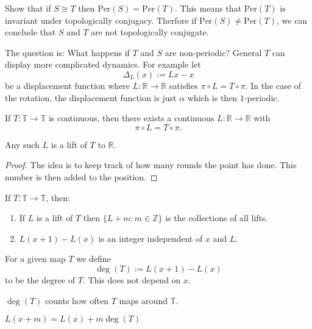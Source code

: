 \documentclass{article}
\newcommand*{\Z}{\mathbb{Z}}
\newcommand*{\R}{\mathbb{R}}
\newcommand*{\T}{\mathbb{T}}
\newcommand*{\Per}{\text{Per}}
\begin{document}
\begin{hw}
    Show that if $S\cong T$ then $\Per(S)=\Per(T)$. This means that $\Per(T)$ is invariant under topologically conjugacy. Therfore if $\Per(S) \neq \Per(T)$, we can conclude that $S$ and $T$ are not topologically conjugate.
\end{hw}

The question is: What happens if $T$ and $S$ are non-periodic?
\newline
\newline
General $T$ can display more complicated dynamics. For example let
$$\Delta_L(x):= Lx-x$$
be a displacement function where $L:\R\to\R$ satisfies $\pi\circ L = T \circ \pi$. In the case of the rotation, the displacement function is just $\alpha$ which is then $1$-periodic.

\begin{prop}
    If $T:\T\to\T$ is continuous, then there exists a continuous $L:\R\to\R$ with
    $$\pi\circ L=T\circ \pi.$$
\end{prop}

\begin{defin}
    Any such $L$ is a lift of $T$ to $\R$.
\end{defin}

\begin{proof}
    The idea is to keep track of how many rounds the point has done. This number is then added to the position.
\end{proof}

\begin{prop}
    If $T: \T\to\T$, then:
    \begin{enumerate}
        \item If $L$ is a lift of $T$ then $\{L+m:m\in\Z\}$ is the collections of all lifts.

        \item $L(x+1)-L(x)$ is an integer independent of $x$ and $L$.
    \end{enumerate}
\end{prop}

\begin{defin}
    For a given map $T$ we define
    $$\deg(T):=L(x+1)-L(x)$$
    to be the degree of $T$. This does not depend on $x$.
\end{defin}

\begin{rem}
    $\deg(T)$ counts how often $T$ maps around $\T$.
\end{rem}

\begin{rem}
    $L(x+m)=L(x)+m\deg(T)$
\end{rem}
\end{document}
